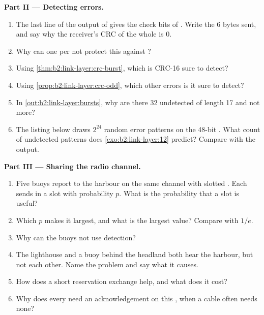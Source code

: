 \begin{problem}
\medskip\noindent\textbf{Part II --- Detecting errors.}\par\nopagebreak
\begin{enumerate}[resume, beginpenalty=10000]
\item The last line of the output of  gives the check bits of . Write the 6 bytes sent, and
say why the receiver's CRC of the whole  is 0.
\item Why can one  per  not protect this  against ?
\item Using \cref{thm:b2:link-layer:crc-burst}, which  is CRC-16 sure to detect?
\item Using \cref{prop:b2:link-layer:crc-odd}, which other errors is it sure to detect?
\item In \cref{out:b2:link-layer:bursts}, why are there 32 undetected  of length 17 and not more?
\item The listing below draws $2^{24}$ random error patterns on the 48-bit . What count of undetected patterns
does \cref{exo:b2:link-layer:12} predict? Compare with the output.
\end{enumerate}

\medskip\noindent\textbf{Part III --- Sharing the radio channel.}\par\nopagebreak
\begin{enumerate}[resume, beginpenalty=10000]
\item Five buoys report to the harbour on the same channel with slotted . Each sends in a slot with
probability $p$. What is the probability that a slot is useful?
\item Which $p$ makes it largest, and what is the largest value? Compare with $1/e$.
\item Why can the buoys not use  detection?
\item The lighthouse and a buoy behind the headland both hear the harbour, but not each other. Name the problem and
say what it causes.
\item How does a short reservation exchange help, and what does it cost?
\item Why does every  need an acknowledgement on this , when a cable often needs none?
\end{enumerate}


\end{problem}
